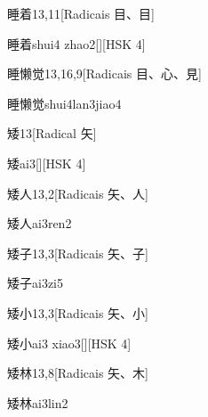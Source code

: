\begin{entry}{睡着}{13,11}[Radicais ⽬、⽬]
  \begin{phonetics}{睡着}{shui4 zhao2}[][HSK 4]
  \end{phonetics}
\end{entry}

\begin{entry}{睡懒觉}{13,16,9}[Radicais ⽬、⼼、⾒]
  \begin{phonetics}{睡懒觉}{shui4lan3jiao4}
  \end{phonetics}
\end{entry}

\begin{entry}{矮}{13}[Radical ⽮]
  \begin{phonetics}{矮}{ai3}[][HSK 4]
  \end{phonetics}
\end{entry}

\begin{entry}{矮人}{13,2}[Radicais ⽮、⼈]
  \begin{phonetics}{矮人}{ai3ren2}
  \end{phonetics}
\end{entry}

\begin{entry}{矮子}{13,3}[Radicais ⽮、⼦]
  \begin{phonetics}{矮子}{ai3zi5}
  \end{phonetics}
\end{entry}

\begin{entry}{矮小}{13,3}[Radicais ⽮、⼩]
  \begin{phonetics}{矮小}{ai3 xiao3}[][HSK 4]
  \end{phonetics}
\end{entry}

\begin{entry}{矮林}{13,8}[Radicais ⽮、⽊]
  \begin{phonetics}{矮林}{ai3lin2}
  \end{phonetics}
\end{entry}

